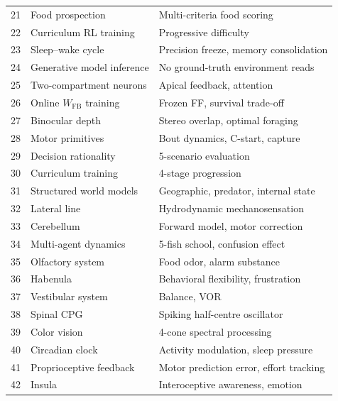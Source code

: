 \documentclass[12pt]{article}
\begin{document}
\begin{table}[H]
\begin{tabular}{clp{7cm}}
21 & Food prospection        & Multi-criteria food scoring \\
22 & Curriculum RL training  & Progressive difficulty \\
23 & Sleep--wake cycle       & Precision freeze, memory consolidation \\
24 & Generative model inference & No ground-truth environment reads \\
25 & Two-compartment neurons & Apical feedback, attention \\
26 & Online $W_\text{FB}$ training & Frozen FF, survival trade-off \\
27 & Binocular depth         & Stereo overlap, optimal foraging \\
28 & Motor primitives        & Bout dynamics, C-start, capture \\
29 & Decision rationality    & 5-scenario evaluation \\
30 & Curriculum training     & 4-stage progression \\
31 & Structured world models & Geographic, predator, internal state \\
32 & Lateral line            & Hydrodynamic mechanosensation \\
33 & Cerebellum              & Forward model, motor correction \\
34 & Multi-agent dynamics    & 5-fish school, confusion effect \\
35 & Olfactory system        & Food odor, alarm substance \\
36 & Habenula                & Behavioral flexibility, frustration \\
37 & Vestibular system       & Balance, VOR \\
38 & Spinal CPG              & Spiking half-centre oscillator \\
39 & Color vision            & 4-cone spectral processing \\
40 & Circadian clock         & Activity modulation, sleep pressure \\
41 & Proprioceptive feedback & Motor prediction error, effort tracking \\
42 & Insula                  & Interoceptive awareness, emotion \\
\bottomrule
\end{tabular}
\end{table}


\end{document}
